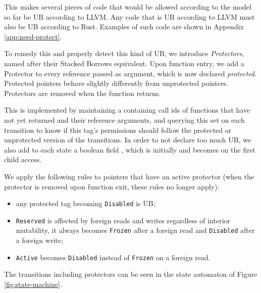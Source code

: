 \documentclass[a4paper,11pt]{article}
\theoremstyle{plain}
\theoremstyle{definition}
\theoremstyle{remark}
\newcommand{\tcode}[1]{\rstinline{#1}}
\newcommand{\tperm}[1]{\texttt{#1}}
\begin{document}
This makes several pieces of code that would be allowed according to the model so
far be UB according to LLVM. Any code that is UB according to LLVM must also be
UB according to Rust. Examples of such code are shown in Appendix \ref{app:need-protect}.

To remedy this and properly detect this kind of UB, we introduce \textit{Protectors},
named after their Stacked Borrows equivalent.
Upon function entry, we add a Protector to every reference passed as argument, which
is now declared \textit{protected}. Protected pointers behave slightly differently from
unprotected pointers. Protectors are removed when the function returns.

This is implemented by maintaining a \tcode{HashSet} containing call ids of functions that have not yet
returned and their reference arguments, and querying this set on each transition
to know if this tag's permissions should follow the protected or unprotected
version of the transitions. In order to not declare too much UB, we also add
to each state a boolean field \tcode{accessed}, which is initially \tcode{false}
and becomes \tcode{true} on the first child access.

We apply the following rules to pointers that have an active protector
(when the protector is removed upon function exit, these rules no longer apply):

\begin{itemize}
    \item any protected tag becoming \tperm{Disabled} is UB;
    \item \tperm{Reserved} is affected by foreign reads and writes regardless of interior mutability,
        it always becomes \tperm{Frozen} after a foreign read and \tperm{Disabled} after a foreign write;
    \item \tperm{Active} becomes \tperm{Disabled} instead of \tperm{Frozen} on a foreign read.
\end{itemize}

The transitions including protectors can be seen in the state automaton of Figure \ref{fig:state-machine}.
\end{document}
